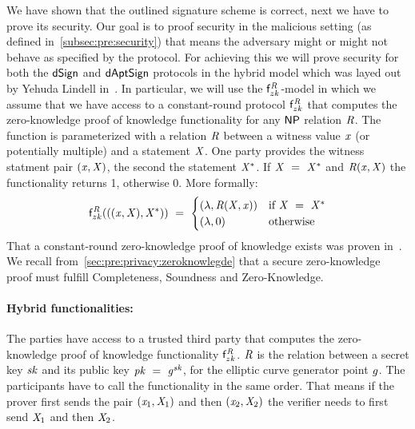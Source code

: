 We have shown that the outlined signature scheme is correct, next we have to prove its security.
Our goal is to proof security in the malicious setting (as defined in~\ref{subsec:pre:security}) that means the adversary might or might not behave as specified by the protocol.
For achieving this we will prove security for both the $\mathsf{dSign}$ and $\mathsf{dAptSign}$ protocols in the hybrid model which was layed out by Yehuda Lindell in~\cite{lindell2017simulate}.
In particular, we will use the $\mathsf{f}^{\mathit{R}}_{zk}$-model in which we assume that we have access to a constant-round protocol $\mathsf{f}^{\mathit{R}}_{zk}$ that computes the zero-knowledge proof of knowledge functionality for any $\mathsf{NP}$ relation $\mathit{R}$.
The function is parameterized with a relation $\mathit{R}$ between a witness value $\mathit{x}$ (or potentially multiple)  and a statement $\mathit{X}$.
One party provides the witness statment pair $(\mathit{x}, \mathit{X})$, the second the statement $\mathit{X}^*$.
If $\mathit{X} ~=~ \mathit{X}^*$ and $\mathit{R} (\mathit{x}, \mathit{X})$ the functionality returns 1, otherwise 0.
More formally:
\[
    \mathsf{f}^{\mathit{R}}_{zk}(((\mathit{x}, \mathit{X}), \mathit{X}^*)) ~=~
    \begin{cases}
        (\lambda, \mathit{R}(\mathit{X}, \mathit{x})) & \text{if } \mathit{X} ~=~ \mathit{X}^* \\
        (\lambda, 0) &\text{otherwise}
    \end{cases}
\]
That a constant-round zero-knowledge proof of knowledge exists was proven in~\cite{lindell2013note}.
We recall from~\ref{sec:pre:privacy:zeroknowlegde} that a secure zero-knowledge proof must fulfill Completeness, Soundness and Zero-Knowledge. 

\paragraph{Hybrid functionalities:} The parties have access to a trusted third party that computes the zero-knowledge proof of knowledge functionality $\mathsf{f}^{\mathit{R}}_{zk}$. $\mathit{R}$ is the relation between a secret key $\mathit{sk}$ and its public key $\mathit{pk} ~=~ \mathit{g}^{\mathit{sk}}$, for the elliptic curve generator point $\mathit{g}$.
The participants have to call the functionality in the same order.
That means if the prover first sends the pair $(\mathit{x}_1, \mathit{X}_1)$ and then $(\mathit{x}_2, \mathit{X}_2)$ the verifier needs to first send $\mathit{X}_1$ and then $\mathit{X}_2$.

